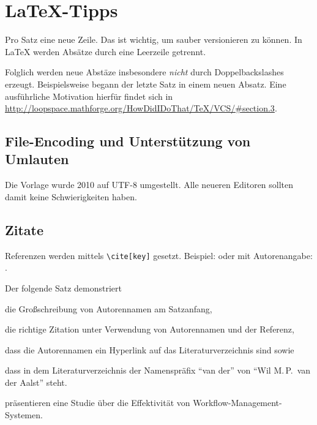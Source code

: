 
\chapter{LaTeX-Tipps}
\label{chap:latextipps}

Pro Satz eine neue Zeile.
Das ist wichtig, um sauber versionieren zu können.
In LaTeX werden Absätze durch eine Leerzeile getrennt.

Folglich werden neue Abstäze insbesondere \emph{nicht} durch Doppelbackslashes erzeugt.
Beispielsweise begann der letzte Satz in einem neuen Absatz.
Eine ausführliche Motivation hierfür findet sich in \url{http://loopspace.mathforge.org/HowDidIDoThat/TeX/VCS/#section.3}.

\section{File-Encoding und Unterstützung von Umlauten}
\label{sec:firstsectioninlatexhints}
Die Vorlage wurde 2010 auf UTF-8 umgestellt.
Alle neueren Editoren sollten damit keine Schwierigkeiten haben.

\section{Zitate}
Referenzen werden mittels \texttt{\textbackslash cite[key]} gesetzt.
Beispiel: \cite{WSPA} oder mit Autorenangabe: \citet{WSPA}.

Der folgende Satz demonstriert \begin{inparaenum}[1.]
  \item die Großschreibung von Autorennamen am Satzanfang,
  \item die richtige Zitation unter Verwendung von Autorennamen und der Referenz,
  \item dass die Autorennamen ein Hyperlink auf das Literaturverzeichnis sind sowie
  \item dass in dem Literaturverzeichnis der Namenspräfix \enquote{van der} von \enquote{Wil M.\,P.\ van der Aalst} steht.
\end{inparaenum}
 präsentieren eine Studie über die Effektivität von Workflow-Management-Systemen.

